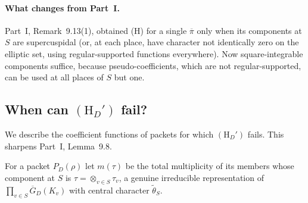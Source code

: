 \documentclass[12pt]{article}
\newcommand{\ov}[1]{\overline{#1}}
\newcommand{\GDb}{\ov{G}_D}
\newcommand{\pib}{\ov{\pi}}
\theoremstyle{plain}
\theoremstyle{definition}
\begin{document}
\paragraph{What changes from Part~I.} Part~I, Remark~9.13(1), obtained (H) for a single $\pib$ only when its components at $S$ are supercuspidal (or, at each place, have character not identically zero on the elliptic set, using regular-supported functions everywhere). Now square-integrable components suffice, because pseudo-coefficients, which are not regular-supported, can be used at all places of $S$ but one.

\subsection{When can $(\mathrm H_D')$ fail?}\label{subsec:cancel2}
We describe the coefficient functions of packets for which $(\mathrm H_D')$ fails. This sharpens Part~I, Lemma~9.8.

For a packet $P_D(\rho)$ let $m(\tau)$ be the total multiplicity of its members whose component at $S$ is $\tau=\otimes_{v\in S}\tau_v$, a genuine irreducible representation of $\prod_{v\in S}\GDb(K_v)$ with central character $\tilde\theta_S$.
\end{document}
